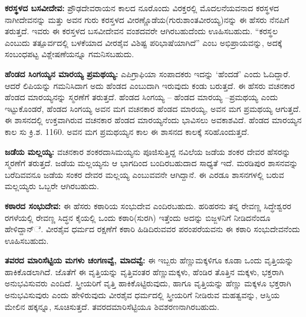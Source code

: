\textbf{ಕರಸ್ಥಳದ ಬಸವೀದೇವ: } ಪ್ರೌಢದೇವರಾಯನ ಕಾಲದ ನೂರೊಂದು ವಿರಕ್ತರಲ್ಲಿ ಮೊದಲನೆಯವನಾದ ಕರಸ್ಥಳದ ನಾಗೀದೇವನನ್ನು ಮತ್ತು ಅವನ ಗುರು ಕರಸ್ತಳದ ವೀರಣ್ಣೊಡೆಯ(ಗುರುಶಾಂತವೀರಯ್ಯ)ನನ್ನು ಈ ಹೆಸರು ನೆನಪಿಗೆ ತರುತ್ತದೆ. ಇವರು ಈ ಕರಸ್ತಳದ ಬಸವೀದೇವನ ವಂಶದವರೇ ಆಗಿರಬಹುದೆಂದು ಊಹಿಸಬಹುದು. “ಕರಸ್ಥಲ ಎಂಬುದು ತತ್ಪೂರ್ವದಲ್ಲಿ ಬಳಕೆಯಾದ ವೀರಶೈವ ವಿಶಿಷ್ಟ ಪರಿಭಾಷೆಯಾಗಿದೆ” ಎಂಬ ಅಭಿಪ್ರಾಯವನ್ನು, ಅದಕ್ಕೆ ಸಂಬಂಧಪಟ್ಟ ವಿಶ್ಲೇಷಣೆಯನ್ನೂ ಗಮನಿಸಬಹುದು.

\textbf{ಹೆಂಡದ ಸಿಂಗಯ್ಯನ ಮಾರಯ್ಯ ಪ್ರಮಥಯ್ಯ:} ಎಪಿಗ್ರಾಫಿಯಾ ಸಂಪಾದಕರು ಇದನ್ನು ‘ಹೆಂದಡೆ’ ಎಂದು ಓದಿದ್ದಾರೆ. ಆದರೆ ಲಿಪಿಯನ್ನು ಗಮನಿಸಿದಾಗ ಅದು ಹೆಂಡದ ಎಂಬುದಾಗಿ ಇರುವುದು ಕಂಡು ಬರುತ್ತದೆ. ಈ ಹೆಸರು ವಚನಕಾರ ಹೆಂಡದ ಮಾರಯ್ಯನನ್ನು ಸ್ಮರಣೆಗೆ ತರುತ್ತದೆ. ಹೆಂಡದ ಸಿಂಗಯ್ಯ – ಹೆಂಡದ ಮಾರಯ್ಯ –ಪ್ರಮಥಯ್ಯ ಎಂದು ಇಟ್ಟುಕೊಂಡರೆ, ಹೆಂಡದ ಸಿಂಗಯ್ಯ ಅವನ ಮಗ ವಚನಕಾರ ಹೆಂಡದ ಮಾರಯ್ಯ, ಅವನ ಮಗ ಪ್ರಮಥಯ್ಯ ಆಗುತ್ತದೆ. ಈ ಶಾಸನದಲ್ಲಿ ಉಕ್ತವಾಗಿರುವ ವಚನಕಾರ ಹೆಂಡದ ಮಾರಯ್ಯನೆಂದು ಭಾವಿಸಲು ಅವಕಾಶವಿದೆ. ಹೆಂಡದ ಮಾರಯ್ಯನ ಕಾಲ ಸು ಕ್ರಿ.ಶ. 1160. ಅವನ ಮಗ ಪ್ರಮಥಯ್ಯನ ಕಾಲ ಈ ಶಾಸನದ ಕಾಲಕ್ಕೆ ಸರಿಹೊಂದುತ್ತದೆ. 

\textbf{ಜಡೆಯ ಮಲ್ಲಯ್ಯ:} ವಚನಕಾರ ಶಂಕರದಾಸಿಮಯ್ಯನು ಪೂಜಿಸುತ್ತಿದ್ದ ನವಿಲೆಯ ಜಡೆಯ ಶಂಕರ ದೇವರ ಹೆಸರನ್ನು ಸ್ಮರಣೆಗೆ ತರುತ್ತದೆ. ಜಡೆಯ ಮಲ್ಲಯ್ಯನು ಆ ಭಾಗದಿಂದ ಬಂದಿರಬಹುದಾದ ಸಾಧ್ಯತೆ ಇದೆ. ಮರಡಿಪುರ ಶಾಸನವನ್ನು ಬರೆದಿವವನೂ ಜಡೆಯ ಸಂಕರ ದೇವರ ಮಲ್ಲಯ್ಯ ಎಂಬುವವನೇ ಆಗಿದ್ದಾನೆ. ಈ ಎರಡೂ ಶಾಸನಗಳಲ್ಲಿ ಬರುವ ಮಲ್ಲಯ್ಯರು ಒಬ್ಬರೇ ಆಗಿರಬಹುದು.

\textbf{ಕಠಾರದ ಸಂಭುದೇವ:} ಈ ಹೆಸರು ಕಠಾರಿಯ ಸಂಭುದೇವ ಎಂದಿರಬಹುದು. ಹರಿಹರನು ತನ್ನ ರೇವಣ್ಣ ಸಿದ್ಧೇಶ್ವರರ ರಗಳೆಯಲ್ಲಿ ರೇವಣ್ಣ ಸಿದ್ಧನ ಕೈಯಲ್ಲಿ ಒಂದು ಕಠಾರಿ(ಸುರಗಿ) ಇತ್ತೆಂದು ಅದನ್ನು ಬಿಜ್ಜಳನಿಗೆ ನೀಡಿದನೆಂದೂ ಹೇಳಿದ್ದಾನ್ೆ. ವೀರಶೈವ ಧರ್ಮದ ರಕ್ಷಣೆಗೆ ಕಠಾರಿ ಹಿಡಿದಿರುವವರ ಪರಂಪರೆಯವನು ಈ ಕಠಾರಿ ಸಂಭುದೇವನೆಂದು ಊಹಿಸಬಹುದು.

\textbf{ತವರದ ಮಾರಿಸೆಟ್ಟಿಯ ಮಗಳು ಚಂಗಣವ್ವೆ, ಮಾದವ್ವೆ:} ಈ ಇಬ್ಬರು ಹೆಣ್ಣುಮಕ್ಕಳಿಗೂ ಕೂಡಾ ಒಂದು ವೃತ್ತಿಯನ್ನು ಹಾಕಿಕೊಡಲಾಗಿದೆ. ಜೊತೆಗೆ ಈ ವೃತ್ತಿಯನ್ನು ವೃತ್ತಿವಂತರ ಹೆಣ್ಣುಮಕ್ಕಳು, ಹೆಂಡಿರ ತೊತ್ತಿನ ಮಕ್ಕಳು, ಭಕ್ತರಾಗಿ ಅನುಭವಿಸುವರು ಎಂದಿದೆ. ಸ್ತ್ರೀಯರಿಗೆ ವೃತ್ತಿ ಹಾಕಿಕೊಟ್ಟಿರುವುದು, ಹಾಗೂ ವೃತ್ತಿಯನ್ನು ಹೆಣ್ಣು ಮಕ್ಕಳೂ ಭಕ್ತರಾಗಿ ಅನುಭವಿಸುವುರು ಎಂದು ಹೇಳಿರುವುದು ವೀರಶೈವ ಧರ್ಮದಲ್ಲಿ ಸ್ತ್ರೀಯರಿಗೆ ನೀಡಿರುವ ಮಹತ್ವವನ್ನು, ಆಸ್ತಿಯ ಮೇಲಿನ ಹಕ್ಕನ್ನೂ, ಸೂಚಿಸುತ್ತದೆ. ತವರದಮಾರಿಸೆಟ್ಟಿಯೂ ಶಿವಶರಣನಾಗಿರಬಹುದು.

